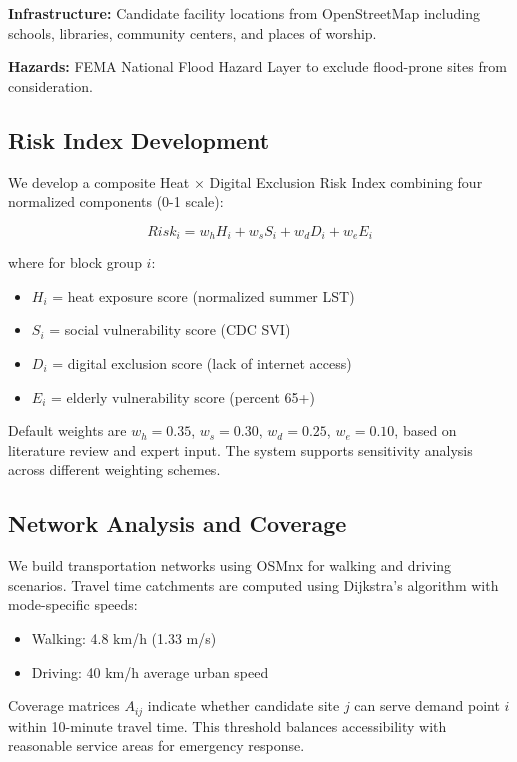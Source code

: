 \documentclass[conference]{IEEEtran}
\begin{document}
\textbf{Infrastructure:} Candidate facility locations from OpenStreetMap including schools, libraries, community centers, and places of worship.

\textbf{Hazards:} FEMA National Flood Hazard Layer to exclude flood-prone sites from consideration.

\subsection{Risk Index Development}

We develop a composite Heat × Digital Exclusion Risk Index combining four normalized components (0-1 scale):

\begin{equation}
Risk_i = w_h H_i + w_s S_i + w_d D_i + w_e E_i
\end{equation}

where for block group $i$:
\begin{itemize}
\item $H_i$ = heat exposure score (normalized summer LST)
\item $S_i$ = social vulnerability score (CDC SVI)
\item $D_i$ = digital exclusion score (lack of internet access)
\item $E_i$ = elderly vulnerability score (percent 65+)
\end{itemize}

Default weights are $w_h = 0.35$, $w_s = 0.30$, $w_d = 0.25$, $w_e = 0.10$, based on literature review and expert input. The system supports sensitivity analysis across different weighting schemes.

\subsection{Network Analysis and Coverage}

We build transportation networks using OSMnx \cite{boeing2017} for walking and driving scenarios. Travel time catchments are computed using Dijkstra's algorithm with mode-specific speeds:
\begin{itemize}
\item Walking: 4.8 km/h (1.33 m/s)
\item Driving: 40 km/h average urban speed
\end{itemize}

Coverage matrices $A_{ij}$ indicate whether candidate site $j$ can serve demand point $i$ within 10-minute travel time. This threshold balances accessibility with reasonable service areas for emergency response.
\end{document}
